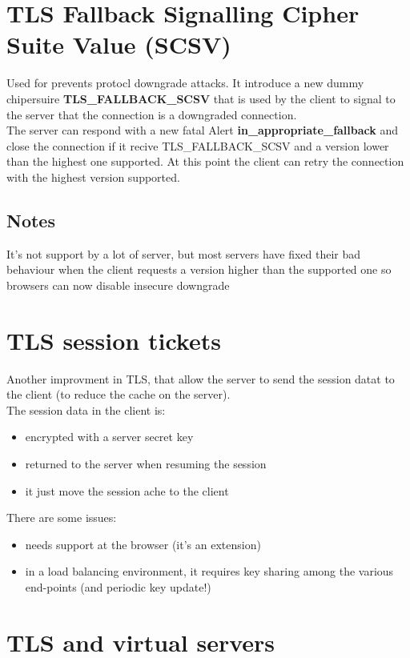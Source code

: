 \section{TLS Fallback Signalling Cipher Suite Value (SCSV)}

Used for prevents protocl downgrade attacks. It introduce a new dummy chipersuire \textbf{TLS\_FALLBACK\_SCSV} that is used by the client to signal to the server that the connection is a downgraded connection. \\
The server can respond with a new fatal Alert \textbf{in\_appropriate\_fallback} and close the connection if it recive TLS\_FALLBACK\_SCSV and a version lower than the highest one supported. At this point the client can retry the connection with the highest version supported. \\

\subsection{Notes}
It's not support by a lot of server, but most servers have fixed their bad behaviour when the client requests a version higher than the supported one so browsers can now disable insecure downgrade

\section{TLS session tickets}

Another improvment in TLS, that allow the server to send the session datat to the client (to reduce the cache on the server). \\
The session data in the client is:
\begin{itemize}
    \item encrypted with a server secret key
    \item returned to the server when resuming the session
    \item it just move the session ache to the client
\end{itemize}
There are some issues:
\begin{itemize}
    \item needs support at the browser (it's an extension)
    \item in a load balancing environment, it requires key sharing among the various end-points (and periodic key update!)
\end{itemize}


\section{TLS and virtual servers}

